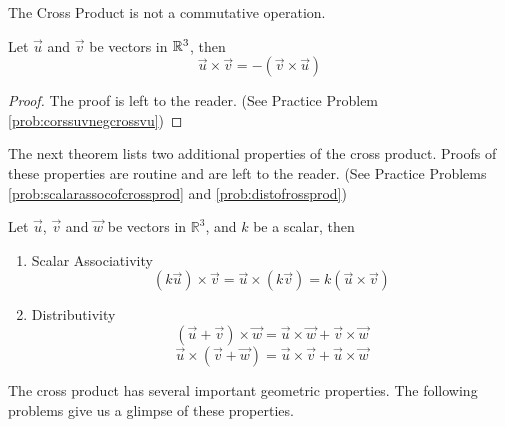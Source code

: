 \documentclass{ximera}
\begin{document}
\begin{warning}The Cross Product is not a commutative operation.
\end{warning}

\begin{theorem}\label{th:corssuvnegcrossvu}
Let $\vec{u}$ and $\vec{v}$ be vectors in $\mathbb{R}^3$, then
$$\vec{u}\times\vec{v}=-(\vec{v}\times\vec{u})$$
\end{theorem}
\begin{proof}
The proof is left to the reader.  (See Practice Problem \ref{prob:corssuvnegcrossvu})
\end{proof}
The next theorem lists two additional properties of the cross product.  Proofs of these properties are routine and are left to the reader.  (See Practice Problems \ref{prob:scalarassocofcrossprod} and \ref{prob:distofrossprod})
\begin{theorem}\label{th:crossproductproperties}
Let $\vec{u}$, $\vec{v}$ and $\vec{w}$ be vectors in $\mathbb{R}^3$, and $k$ be a scalar, then\\
\begin{enumerate}
\item\label{item:scalarassocofcrossprod} Scalar Associativity
$$(k\vec{u})\times \vec{v}=\vec{u}\times (k\vec{v})=k(\vec{u}\times \vec{v})$$
\item\label{item:distofrossprod} Distributivity
$$(\vec{u}+\vec{v})\times \vec{w}=\vec{u}\times \vec{w}+\vec{v}\times \vec{w}$$
$$\vec{u}\times (\vec{v}+\vec{w})=\vec{u}\times \vec{v}+\vec{u}\times \vec{w}$$
\end{enumerate}
\end{theorem}

The cross product has several important geometric properties. The following problems give us a glimpse of these properties.
\end{document}
